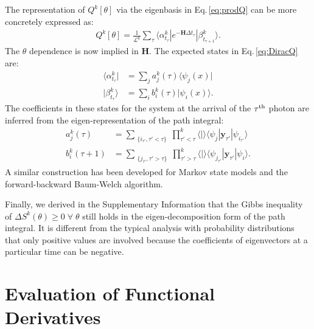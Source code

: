 \documentclass[journal=jpcbfk,manuscript=article,layout=twocolumn,articletitle=true]{achemso}
\begin{document}
The representation of $Q^k[\theta]$ via the eigenbasis in Eq.\,\ref{eq:prodQ} can be more concretely expressed as:
\begin{align}
\label{eq:DiracQ}
Q^k[\theta] = \frac{1}{\mathcal{L}^k} \sum_{\tau} \langle \alpha^k_{t_\tau} | e^{-\bm{H} \Delta t_{\tau} } | \beta^k_{t_{\tau+1}} \rangle.
\end{align}
The $\theta$ dependence is now implied in $\bm{H}$. The expected states in Eq.\,\ref{eq:DiracQ} are:
\begin{align}
\label{eq:DiracQa}
\langle \alpha^k_{t_\tau} | &= \sum_j a^k_j(\tau) \langle \psi_j(x) | \\
\label{eq:DiracQb}
| \beta^k_{t_\tau} \rangle  &= \sum_i b^k_i(\tau) | \psi_i(x) \rangle.
\end{align}
The coefficients in these states for the system at the arrival of the $\tau^{\rm th}$ photon are inferred from the eigen-representation of the path integral:
\begin{align}
\label{eq:DiracQaCoeff}
a^k_j(\tau) &= \sum_{\substack{\{i_{\tau'}, \tau' < \tau \}}} {{\prod}^k_{\tau' < \tau} \langle |\rangle} \langle \psi_j | \bm{y}_{\tau'} | \psi_{i_{\tau'}} \rangle \\
\label{eq:DiracQbCoeff}
b^k_i(\tau+1) &= \sum_{\substack{\{j_{\tau'}, \tau' > \tau \}}} {{\prod}^k_{\tau' > \tau} \langle |\rangle} \langle \psi_{j_{\tau'}} | \bm{y}_{\tau'} | \psi_i \rangle.
\end{align}
A similar construction has been developed for Markov state models and the forward-backward Baum-Welch algorithm.\cite{Chodera:2011uw}

Finally, we derived in the Supplementary Information that the Gibbs inequality of $\Delta S^k(\theta) \ge 0 \; \forall \; \theta$ still holds in the eigen-decomposition form of the path integral. It is different from the typical analysis with probability distributions that only positive values are involved because the coefficients of eigenvectors at a particular time can be negative.

\section{Evaluation of Functional Derivatives}
\end{document}

